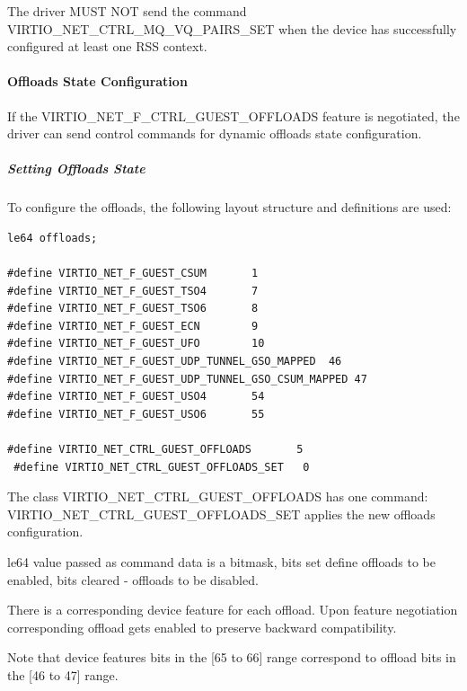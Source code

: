 The driver MUST NOT send the command VIRTIO_NET_CTRL_MQ_VQ_PAIRS_SET when the device has successfully configured at least one RSS context.

\paragraph{Offloads State Configuration}\label{sec:Device Types / Network Device / Device Operation / Control Virtqueue / Offloads State Configuration}

If the VIRTIO_NET_F_CTRL_GUEST_OFFLOADS feature is negotiated, the driver can
send control commands for dynamic offloads state configuration.

\subparagraph{Setting Offloads State}\label{sec:Device Types / Network Device / Device Operation / Control Virtqueue / Offloads State Configuration / Setting Offloads State}

To configure the offloads, the following layout structure and
definitions are used:

\begin{lstlisting}
le64 offloads;

#define VIRTIO_NET_F_GUEST_CSUM       1
#define VIRTIO_NET_F_GUEST_TSO4       7
#define VIRTIO_NET_F_GUEST_TSO6       8
#define VIRTIO_NET_F_GUEST_ECN        9
#define VIRTIO_NET_F_GUEST_UFO        10
#define VIRTIO_NET_F_GUEST_UDP_TUNNEL_GSO_MAPPED  46
#define VIRTIO_NET_F_GUEST_UDP_TUNNEL_GSO_CSUM_MAPPED 47
#define VIRTIO_NET_F_GUEST_USO4       54
#define VIRTIO_NET_F_GUEST_USO6       55

#define VIRTIO_NET_CTRL_GUEST_OFFLOADS       5
 #define VIRTIO_NET_CTRL_GUEST_OFFLOADS_SET   0
\end{lstlisting}

The class VIRTIO_NET_CTRL_GUEST_OFFLOADS has one command:
VIRTIO_NET_CTRL_GUEST_OFFLOADS_SET applies the new offloads configuration.

le64 value passed as command data is a bitmask, bits set define
offloads to be enabled, bits cleared - offloads to be disabled.

There is a corresponding device feature for each offload. Upon feature
negotiation corresponding offload gets enabled to preserve backward
compatibility.

Note that device features bits in the [65 to 66] range correspond to
offload bits in the [46 to 47] range.


